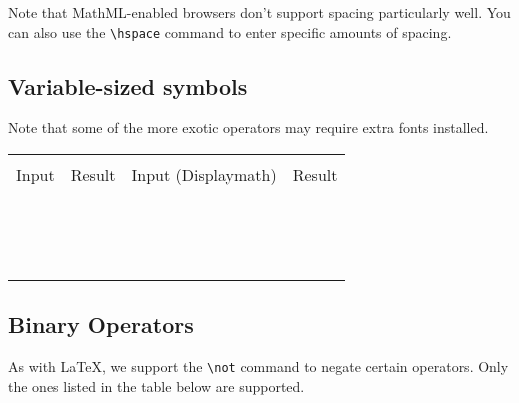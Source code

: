 Note that MathML-enabled browsers don't support spacing particularly well.
You can also use the \verb|\hspace| command to enter specific amounts of spacing.

\begin{demotable}
\end{demotable}

\subsection*{Variable-sized symbols}

Note that some of the more exotic operators may require extra fonts installed.

\newcommand{\dmdemo}[1]{\minout{#1} & \dminout{#1} \\}
\newcommand{\vdemo}[1]{\dmdemo{#1_a^b A_{\lambda}}}

\newenvironment{dmdemotable}
{\begin{center}
 \begin{tabular}{|r|l|r|l|}
 \hline \\
 Input & Result & Input (Displaymath) & Result \\
 \hline \\
}{\hline
 \end{tabular}
 \end{center}
}

\begin{dmdemotable}
\vdemo{\sum}
\vdemo{\prod}
\vdemo{\coprod}
\vdemo{\int}
\vdemo{\oint}
\vdemo{\bigcap}
\vdemo{\bigcup}
\vdemo{\bigsqcup}
\vdemo{\bigvee}
\vdemo{\bigwedge}
\vdemo{\bigodot}
\vdemo{\bigotimes}
\vdemo{\bigoplus}
\vdemo{\biguplus}
\end{dmdemotable}

\subsection*{Binary Operators}

As with LaTeX, we support the \verb|\not| command to negate certain operators. Only
the ones listed in the table below are supported.

\newcommand{\rdemo}[1]{\minout{#1} & & \\}
\newcommand{\rndemo}[1]{\minout{#1} & \minout{\not #1} \\}
\newenvironment{rdemotable}
{\begin{center}
 \begin{tabular}{|r|l|r|l|}
 \hline \\
 Input & Result & Input (negated) & Result \\
 \hline \\
}{\hline
 \end{tabular}
 \end{center}
}

